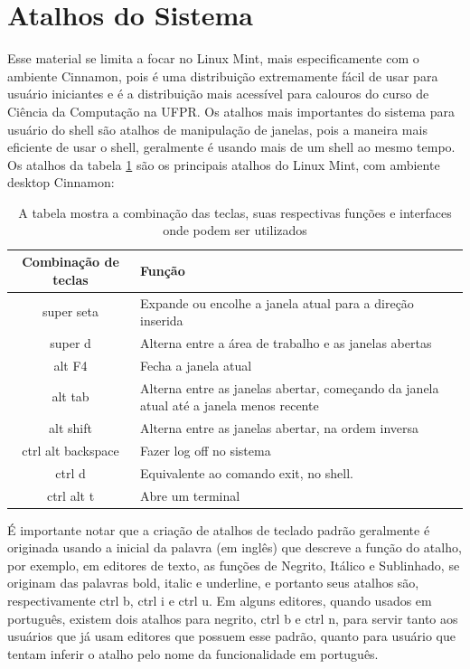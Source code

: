 \documentclass[oneside, 11 pt]{article}
\begin{document}
	\section{Atalhos do Sistema}
	Esse material se limita a focar no Linux Mint, mais especificamente com o ambiente Cinnamon, pois é uma distribuição extremamente fácil de usar para usuário iniciantes e é a distribuição mais acessível para calouros do curso de Ciência da Computação na UFPR. Os atalhos mais importantes do sistema para usuário do shell são atalhos de manipulação de janelas, pois a maneira mais eficiente de usar o shell, geralmente é usando mais de um shell ao mesmo tempo. Os atalhos da tabela \ref{table:5} são os principais atalhos do Linux Mint, com ambiente desktop Cinnamon:
	
	\pagebreak
	
	\begin{table}
		\centering
		\begin{tabular}{|c|p{10.0cm}|}
			\hline
			\bfseries Combinação de teclas & \bfseries Função \\ \hline
			super seta & Expande ou encolhe a janela atual para a direção inserida \\ \hline
			super d & Alterna entre a área de trabalho e as janelas abertas \\ \hline
			alt F4 & Fecha a janela atual \\ \hline
			alt tab & Alterna entre as janelas abertar, começando da janela atual até a janela menos recente\\ \hline
			alt shift & Alterna entre as janelas abertar, na ordem inversa\\ \hline
			ctrl alt backspace & Fazer log off no sistema \\ \hline
			ctrl d & Equivalente ao comando exit, no shell. \\ \hline
			ctrl alt t & Abre um terminal \\ \hline
		\end{tabular}
		\caption{A tabela mostra a combinação das teclas, suas respectivas funções e interfaces onde podem ser utilizados}
		\label{table:5}
	\end{table}
	
	É importante notar que a criação de atalhos de teclado padrão geralmente é originada usando a inicial da palavra (em inglês) que descreve a função do atalho, por exemplo, em editores de texto, as funções de Negrito, Itálico e Sublinhado, se originam das palavras bold, italic e underline, e portanto seus atalhos são, respectivamente ctrl b, ctrl i e ctrl u. Em alguns editores, quando usados em português, existem dois atalhos para negrito, ctrl b e ctrl n, para servir tanto aos usuários que já usam editores que possuem esse padrão, quanto para usuário que tentam inferir o atalho pelo nome da funcionalidade em português.
	
\end{document}
